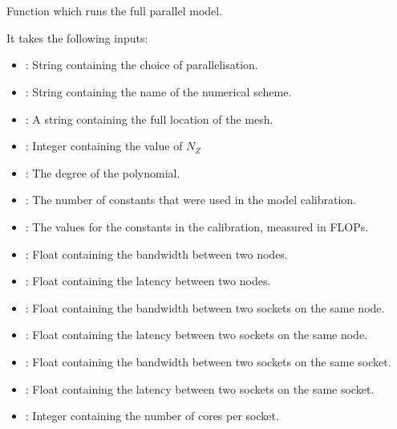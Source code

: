 \chapter{} %

\label{Chapter7} %

\section{}
Function which runs the full parallel model.

It takes the following inputs:

\begin{itemize}
\item {}: String containing the choice of parallelisation.
\item {}: String containing the name of the numerical scheme.
\item {}: A string containing the full location of the mesh.
\item {}: Integer containing the value of \(N_Z\)
\item {}: The degree of the polynomial.
\item {}: The number of constants that were used in the model calibration.
\item {}: The values for the constants in the calibration, measured in FLOPs.
\item {}: Float containing the bandwidth between two nodes.
\item {}: Float containing the latency between two nodes.
\item {}: Float containing the bandwidth between two sockets on the same node.
\item {}: Float containing the latency between two sockets on the same node.
\item {}: Float containing the bandwidth between two sockets on the same socket.
\item {}: Float containing the latency between two sockets on the same socket.
\item {}: Integer containing the number of cores per socket.

\end{itemize}
